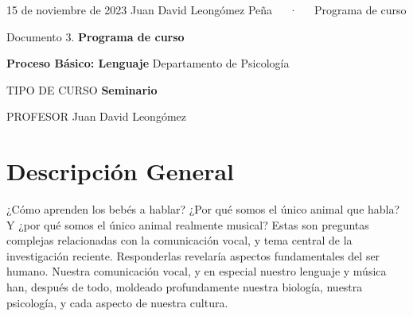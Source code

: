 \documentclass[11pt,a4paper,]{awesome-cv}
\begin{document}
\makecvheader

\makecvfooter
  {15 de noviembre de 2023}
    {Juan David Leongómez Peña~~~·~~~Programa de curso}
  {\thepage}





\vspace{4mm}
\begin{tcolorbox}[enhanced,
        on line, 
        boxsep=4pt, left=0pt,right=0pt,top=0pt,bottom=0pt,
        colframe=white,colback=black]
  
\color{white}
\begin{LARGE}\begin{center}
Documento 3. \textbf{Programa de curso}
\end{center}\end{LARGE}
\end{tcolorbox}

\begin{LARGE}\begin{center}
\textbf{Proceso Básico: Lenguaje}\linebreak
Departamento de Psicología
\end{center}\end{LARGE}

\begin{cvskills}
  \cvskill
    {TIPO DE CURSO}
    {\textbf{Seminario}}
    
  \cvskill
    {PROFESOR}
    {Juan David Leongómez}
\end{cvskills}

\hypertarget{descripciuxf3n-general}{%
\section{Descripción General}\label{descripciuxf3n-general}}

¿Cómo aprenden los bebés a hablar? ¿Por qué somos el único animal que
habla? Y ¿por qué somos el único animal realmente musical? Estas son
preguntas complejas relacionadas con la comunicación vocal, y tema
central de la investigación reciente. Responderlas revelaría aspectos
fundamentales del ser humano. Nuestra comunicación vocal, y en especial
nuestro lenguaje y música han, después de todo, moldeado profundamente
nuestra biología, nuestra psicología, y cada aspecto de nuestra cultura.
\end{document}
